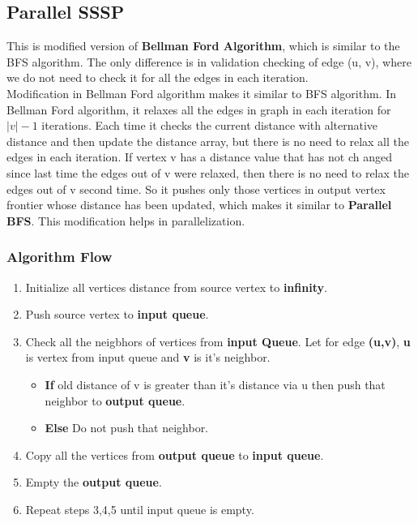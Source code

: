 \documentclass{article}
\begin{document}


\subsection{Parallel SSSP} 

This is modified version of \textbf{Bellman Ford Algorithm}, which is similar to the BFS algorithm. The only difference is in validation checking of edge (u, v), where we do not need to check it for all the edges in each iteration. \\

Modification in Bellman Ford algorithm makes it similar to BFS algorithm. In Bellman Ford algorithm, it relaxes all the edges in graph in each iteration for $|v| - 1$ iterations. Each time it checks the current distance with alternative distance and then update the distance array, but there is no need to relax all the edges in each iteration. If vertex v has a distance value that has not ch anged since last time the edges out of v were relaxed, then there is no need to relax the edges out of v second time. So it pushes only those vertices in output vertex frontier whose distance has been updated, which makes it similar to \textbf{Parallel BFS}. This modification helps in parallelization. \\


\subsubsection{Algorithm Flow}
\begin{enumerate}
\item Initialize all vertices distance from source vertex to \textbf{infinity}.
\item Push source vertex to \textbf{input queue}.
\item Check all the neigbhors of vertices from \textbf{input Queue}. Let for edge \textbf{(u,v)}, \textbf{u} is vertex from input queue and \textbf{v} is it's neighbor. 
\begin{itemize}
\item \textbf{If} old distance of v is greater than it's distance via u then push that neighbor to \textbf{output queue}.
\item \textbf{Else} Do not push that neighbor.
\end{itemize} 
\item Copy all the vertices from \textbf{output queue} to \textbf{input queue}.
\item Empty the \textbf{output queue}.
\item Repeat steps 3,4,5 until input queue is empty.
\end{enumerate}
\end{document}
